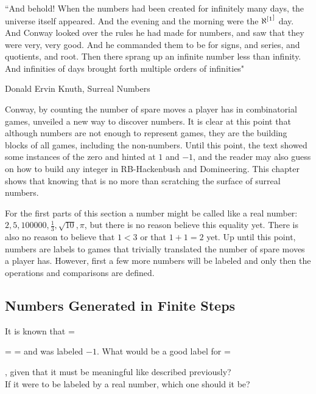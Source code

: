 \epigraph{``And behold! When the numbers had been created for infinitely many days, the universe itself appeared. And the evening and the morning were the $\aleph^[\footnotemark^]$ day. And Conway looked over the rules he had made for numbers, and saw that they were very, very good. And he commanded them to be for signs, and series, and quotients, and root. Then there sprang up an infinite number less than infinity. And infinities of days brought forth multiple orders of infinities"}{Donald Ervin Knuth, Surreal Numbers \footnotemark}




Conway, by counting the number of spare moves a player has in combinatorial games, unveiled a new way to discover numbers. It is clear at this point that although numbers are not enough to represent games, they are the building blocks of all games, including the non-numbers. Until this point, the text showed some instances of the zero and hinted at $1$ and $-1$, and the reader may also guess on how to build any integer in RB-Hackenbush and Domineering. This chapter shows that knowing that is no more than scratching the surface of surreal numbers.

For the first parts of this section a number  might be called like a real number: $2, 5, 100000, \frac{1}{3}, \sqrt{10}, \pi$, but there is no reason believe this equality yet. There is also no reason to believe that $1 < 3$ or that $1 + 1 = 2$ yet. Up until this point, numbers are labels to games that trivially translated the number of spare moves a player has. However, first a few more numbers will be labeled and only then the operations and comparisons are defined.


\subsection*{Numbers Generated in Finite Steps}

It is known that \Gm{} =
 = \gam{}{\gam{}{}} =  and \Gm{} was labeled $-1$.
What would be a good label for \Hm = , given that it must be meaningful like described previously?\\ If it were to be labeled by a real number, which one should it be?


